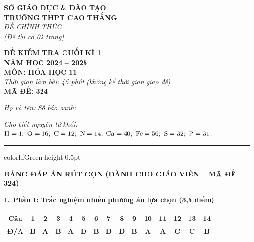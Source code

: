 \documentclass[11pt,a4paper]{article}
\begin{document}
\begin{minipage}[t]{0.48\textwidth}
\textbf{SỞ GIÁO DỤC \& ĐÀO TẠO}\\
\textbf{TRƯỜNG THPT CAO THẮNG}\\
\textit{ĐỀ CHÍNH THỨC}\\
\textit{(Đề thi có 04 trang)}
\end{minipage}
\hfill
\begin{minipage}[t]{0.48\textwidth}
\raggedleft
\textbf{\color{hfRed}ĐỀ KIỂM TRA CUỐI KÌ 1}\\
\textbf{NĂM HỌC 2024 -- 2025}\\
\textbf{MÔN: HÓA HỌC 11}\\
\textit{Thời gian làm bài: 45 phút (không kể thời gian giao đề)}\\
\textbf{MÃ ĐỀ: 324}
\end{minipage}

\vspace{4pt}
\noindent
\textit{Họ và tên:} \dotfill \textit{Số báo danh:} \dotfill

\vspace{3pt}
\noindent
\textit{\footnotesize Cho biết nguyên tử khối: $\ce{H}=1;\ \ce{O}=16;\ \ce{C}=12;\ \ce{N}=14;\ \ce{Ca}=40;\ \ce{Fe}=56;\ \ce{S}=32;\ \ce{P}=31$.}

\vspace{3pt}
\hrule color{hfGreen} height 0.5pt

\vspace{6pt}
\begin{center}
{\Large\textbf{\color{hfRed}BẢNG ĐÁP ÁN RÚT GỌN (DÀNH CHO GIÁO VIÊN -- MÃ ĐỀ 324)}}
\end{center}

\vspace{2pt}
\noindent
\textbf{\color{mainGreen}1. Phần I: Trắc nghiệm nhiều phương án lựa chọn (3,5 điểm)}
\begin{center}
\renewcommand{\arraystretch}{1.2}
\begin{tabular}{|c|c|c|c|c|c|c|c|c|c|c|c|c|c|c|}
\hline
\rowcolor{tableGreen}
\textbf{Câu} & \textbf{1} & \textbf{2} & \textbf{3} & \textbf{4} & \textbf{5} & \textbf{6} & \textbf{7} & \textbf{8} & \textbf{9} & \textbf{10} & \textbf{11} & \textbf{12} & \textbf{13} & \textbf{14} \\
\hline
\textbf{Đ/A} & \textbf{\color{hfRed}B} & \textbf{\color{hfRed}A} & \textbf{\color{hfRed}B} & \textbf{\color{hfRed}A} & \textbf{\color{hfRed}D} & \textbf{\color{hfRed}B} & \textbf{\color{hfRed}D} & \textbf{\color{hfRed}D} & \textbf{\color{hfRed}B} & \textbf{\color{hfRed}A} & \textbf{\color{hfRed}A} & \textbf{\color{hfRed}C} & \textbf{\color{hfRed}C} & \textbf{\color{hfRed}B} \\
\hline
\end{tabular}
\end{center}
\end{document}
